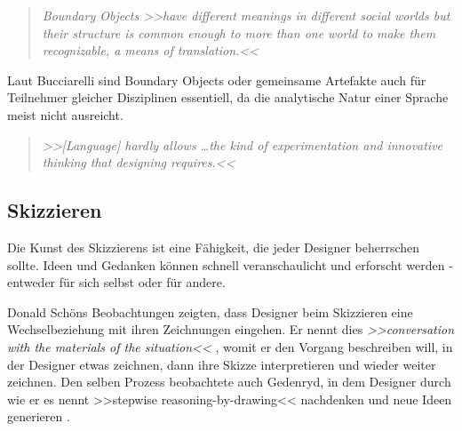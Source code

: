 \begin{quote}
	\textsl{Boundary Objects >>have different meanings in different social worlds but their structure is common enough to more than one world to make them recognizable, a means of translation.<<}
\begin{flushright}\citep{Star:1989}\end{flushright}
\end{quote}

Laut Bucciarelli \citep{Bucciarelli:2002} sind Boundary Objects oder gemeinsame Artefakte auch für Teilnehmer gleicher Disziplinen essentiell, da die analytische Natur einer Sprache meist nicht ausreicht.
\begin{quote}
	\textsl{>>[Language] hardly allows \ldots the kind of experimentation and innovative thinking that designing requires.<<}
\begin{flushright}\citep{Bucciarelli:2002}\end{flushright}
\end{quote}

\subsection{Skizzieren}
Die Kunst des Skizzierens ist eine Fähigkeit, die jeder Designer beherrschen sollte. Ideen und Gedanken können schnell veranschaulicht und erforscht werden - entweder für sich selbst oder für andere. \citep{Sagmeister:2008} 

\medskip Donald Schöns Beobachtungen zeigten, dass Designer beim Skizzieren eine Wechselbeziehung mit ihren Zeichnungen eingehen. Er nennt dies \emph{>>conversation with the materials of the situation<<} \citep{Schoen:1983}, womit er den Vorgang beschreiben will, in der Designer etwas zeichnen, dann ihre Skizze interpretieren und wieder weiter zeichnen. Den selben Prozess beobachtete auch Gedenryd, in dem Designer durch wie er es nennt >>stepwise reasoning-by-drawing<< nachdenken und neue Ideen generieren \citep{Gedenryd:1998}.

